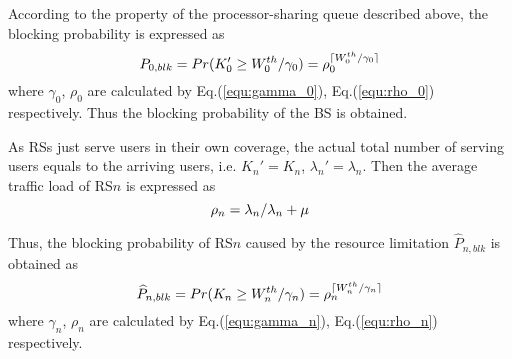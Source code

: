 \documentclass[conference]{IEEEtran}
\begin{document}
\begin{appendix}
 According to the property of the processor-sharing queue described above, the blocking probability is expressed as
 \begin{equation}\label{equ:P0}
 \small{
 P_{0,blk}=Pr(K_0'\geq W_0^{th}/\gamma_0)=\rho_0^{\lceil W_0^{th}/\gamma_0\rceil}
 }
 \end{equation}
 where $\gamma_0$, $\rho_0$ are calculated by Eq.(\ref{equ:gamma_0}), Eq.(\ref{equ:rho_0}) respectively. Thus the blocking probability of the BS is obtained.

 As RSs just serve users in their own coverage, the actual total number of serving users equals to the arriving users, i.e. $K_n'=K_n$, $\lambda_n'=\lambda_n$. Then the average traffic load of RS$n$ is expressed as
 \begin{equation}\label{equ:rho_n}
 \small{
 \rho_n=\lambda_n/\lambda_n+\mu
 }
 \end{equation}

 Thus, the blocking probability of RS$n$ caused by the resource limitation $\widehat{P}_{n,blk}$ is obtained as
 \begin{equation}\label{equ:Pn}
 \small{
 \widehat{P}_{n,blk}=Pr(K_n\geq W_n^{th}/\gamma_n)=\rho_n^{\lceil W_n^{th}/\gamma_n\rceil}
 }
 \end{equation}
 where $\gamma_n$, $\rho_n$ are calculated by Eq.(\ref{equ:gamma_n}), Eq.(\ref{equ:rho_n}) respectively.

\end{appendix}
\end{document}
